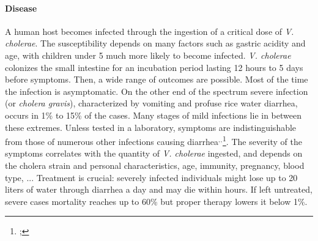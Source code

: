 \paragraph{Disease} A human host becomes infected through the ingestion of a critical dose of \emph{V. cholerae}\cite{Kaper:Cholera:1995}\cite{Nelson:CholeraTransmissionHost:2009}. The susceptibility depends on many factors such as gastric acidity and age, with children under 5 much more likely to become infected\cite{Sack:Cholera:2004}. \textit{V. cholerae} colonizes the small intestine for an incubation period lasting 12 hours to 5 days\cite{Azman:IncubationPeriodCholera:2013} before symptoms. Then, a wide range of outcomes are possible. Most of the time the infection is asymptomatic. On the other end of the spectrum severe infection (or \emph{cholera gravis}), characterized by vomiting and profuse rice water diarrhea, occurs in 1\% to 15\% of the cases. Many stages of mild infections lie in between these extremes. Unless tested in a laboratory, symptoms are indistinguishable from those of numerous other infections causing diarrhea\footnotemark[17]$^{,}$\footnotemark[18]$^{,}$\footnote{;%
}.  The severity of the symptoms correlates with the quantity of \textit{V. cholerae} ingested\cite{Brouwer:DoseresponseRelationshipsEnvironmentally:2017}, and depends on the cholera strain and personal characteristics, age, immunity, pregnancy, blood type\cite{WHO:CholeraVaccinesWHO:2017,Azman:IncubationPeriodCholera:2013}, ...%
 Treatment is crucial: severely infected individuals might lose up to 20 liters of water through diarrhea a day and may die within hours. If left untreated, severe cases mortality reaches up to 60\% but proper therapy lowers it below 1\%\cite{Luquero:MortalityRatesCholera:2016}.

